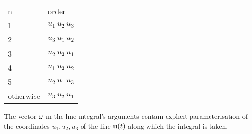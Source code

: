\begin{center}
\begin{tabular}{ll}
n & order\\ 1 & $u_1~u_2~u_3$\\
%
2 & $u_3~u_1~u_2$\\
%
3 & $u_2~u_3~u_1$\\
%
4 & $u_1~u_3~u_2$\\
%
5 & $u_2~u_1~u_3$\\ otherwise & $u_3~u_2~u_1$\\
\end{tabular}
\end{center}


The vector ${\bf \omega}$ in the line integral's arguments contain
explicit parameterisation of the coordinates $u_1, u_2, u_3$ of the
line ${\bf u}(t)$ along which the integral is taken.

